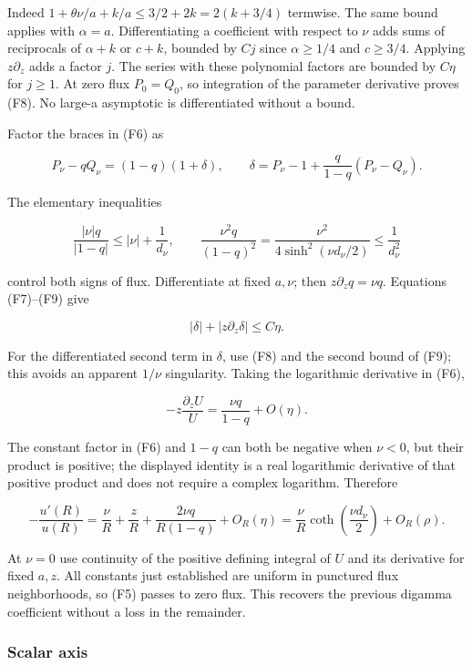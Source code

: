 \documentclass[11pt]{article}
\begin{document}
Indeed \(1+\theta\nu/a+k/a\leq3/2+2k=2(k+3/4)\) termwise. The same bound
applies with \(\alpha=a\). Differentiating a coefficient with respect to
\(\nu\) adds sums of reciprocals of \(\alpha+k\) or \(c+k\), bounded by
\(Cj\) since \(\alpha\geq1/4\) and \(c\geq3/4\). Applying
\(z\partial_z\) adds a factor \(j\). The series with these polynomial
factors are bounded by \(C\eta\) for \(j\geq1\). At zero flux
\(P_0=Q_0\), so integration of the parameter derivative proves (F8). No
large-a asymptotic is differentiated without a bound.

Factor the braces in (F6) as

\[P_\nu-qQ_\nu=(1-q)(1+\delta),\qquad
\delta=P_\nu-1+\frac q{1-q}(P_\nu-Q_\nu).\]

The elementary inequalities

\[\frac{|\nu|q}{|1-q|}\leq|\nu|+\frac1{d_\nu},\qquad
\frac{\nu^2q}{(1-q)^2}=\frac{\nu^2}{4\sinh^2(\nu d_\nu/2)}\leq\frac1{d_\nu^2}\tag{F9}\]

control both signs of flux. Differentiate at fixed \(a,\nu\); then
\(z\partial_zq=\nu q\). Equations (F7)--(F9) give

\[|\delta|+|z\partial_z\delta|\leq C\eta.\tag{F10}\]

For the differentiated second term in \(\delta\), use (F8) and the
second bound of (F9); this avoids an apparent \(1/\nu\) singularity.
Taking the logarithmic derivative in (F6),

\[-z\frac{\partial_zU}{U}=\frac{\nu q}{1-q}+O(\eta).\]

The constant factor in (F6) and \(1-q\) can both be negative when
\(\nu<0\), but their product is positive; the displayed identity is a
real logarithmic derivative of that positive product and does not
require a complex logarithm. Therefore

\[-\frac{u'(R)}{u(R)}=\frac\nu R+\frac zR+
\frac{2\nu q}{R(1-q)}+O_R(\eta)
=\frac\nu R\coth\left(\frac{\nu d_\nu}2\right)+O_R(\rho).\]

At \(\nu=0\) use continuity of the positive defining integral of \(U\)
and its derivative for fixed \(a,z\). All constants just established are
uniform in punctured flux neighborhoods, so (F5) passes to zero flux.
This recovers the previous digamma coefficient without a loss in the
remainder.

\subsubsection{Scalar axis}\label{scalar-axis}
\end{document}
